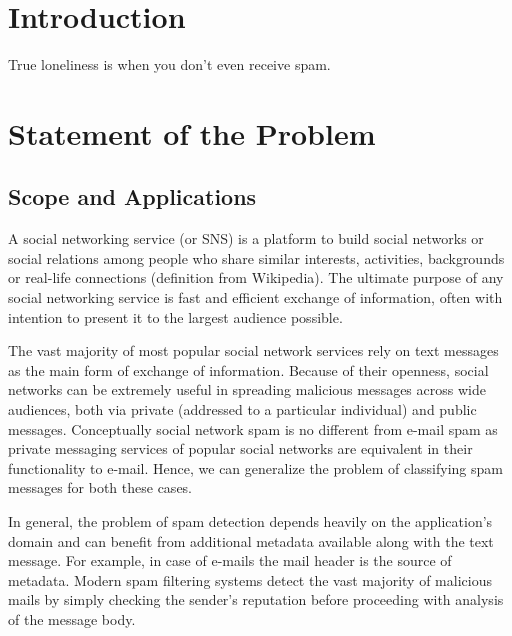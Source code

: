 \documentclass[12pt]{report}
\begin{document}
\renewcommand{\bibname}{References}
\setcounter{tocdepth}{1}

\setcounter{page}{2}

\large

\thispagestyle{empty}
\tableofcontents
\thispagestyle{empty}


\chapter*{Introduction}

True loneliness is when you don’t even receive spam.

\newpage


\chapter{Statement of the Problem}

\section{Scope and Applications}

A social networking service (or SNS) is a platform to build social networks or social relations among people who share similar interests, activities, backgrounds or real-life connections (definition from Wikipedia). The ultimate purpose of any social networking service is fast and efficient exchange of information, often with intention to present it to the largest audience possible.

The vast majority of most popular social network services rely on text messages as the main form of exchange of information. Because of their openness, social networks can be extremely useful in spreading malicious messages across wide audiences, both via private (addressed to a particular individual) and public messages. Conceptually social network spam is no different from e-mail spam as private messaging services of popular social networks are equivalent in their functionality to e-mail. Hence, we can generalize the problem of classifying spam messages for both these cases.

In general, the problem of spam detection depends heavily on the application's domain and can benefit from additional metadata available along with the text message. For example, in case of e-mails the mail header is the source of metadata. Modern spam filtering systems detect the vast majority of malicious mails by simply checking the sender's reputation before proceeding with analysis of the message body.
\end{document}
